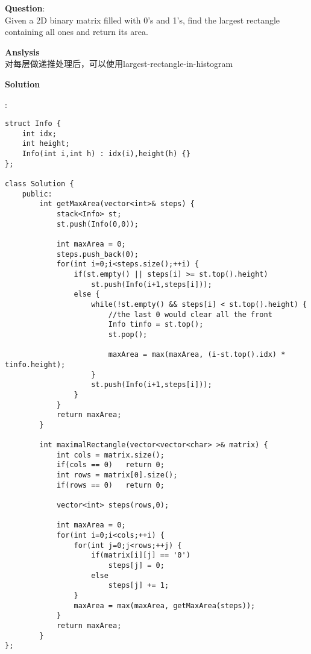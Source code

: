     
\begin{description}
    \item{\textbf{Question}}:\\%
		Given a 2D binary matrix filled with 0's and 1's, find the largest rectangle containing all ones and return its area.\\

    \item{\textbf{Anslysis}}\\
		对每层做递推处理后，可以使用largest-rectangle-in-histogram\\

    \item{\textbf{Solution}}\\
	\item{} : \\
		\begin{lstlisting}
struct Info {
	int idx;
	int height;
	Info(int i,int h) : idx(i),height(h) {}
};

class Solution {
	public:
		int getMaxArea(vector<int>& steps) {
			stack<Info> st;
			st.push(Info(0,0));

			int maxArea = 0;
			steps.push_back(0);
			for(int i=0;i<steps.size();++i) {
				if(st.empty() || steps[i] >= st.top().height)
					st.push(Info(i+1,steps[i]));
				else {
					while(!st.empty() && steps[i] < st.top().height) {
						//the last 0 would clear all the front
						Info tinfo = st.top();
						st.pop();

						maxArea = max(maxArea, (i-st.top().idx) * tinfo.height);
					}
					st.push(Info(i+1,steps[i]));
				}
			}
			return maxArea;
		}

		int maximalRectangle(vector<vector<char> >& matrix) {
			int cols = matrix.size();
			if(cols == 0)	return 0;
			int rows = matrix[0].size();
			if(rows == 0)	return 0;

			vector<int> steps(rows,0);

			int maxArea = 0;
			for(int i=0;i<cols;++i) {
				for(int j=0;j<rows;++j) {
					if(matrix[i][j] == '0')
						steps[j] = 0;
					else
						steps[j] += 1;
				}
				maxArea = max(maxArea, getMaxArea(steps));
			}
			return maxArea;
		}
};
		\end{lstlisting}

\end{description}

